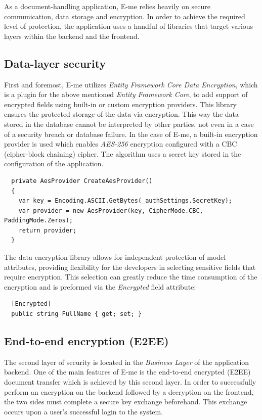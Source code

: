 As a document-handling application, E-me relies heavily on secure communication, data storage and encryption.
In order to achieve the required level of protection, the application uses a handful of libraries that target various layers within the backend and the frontend.

\subsection{Data-layer security}

First and foremost, E-me utilizes \emph{Entity Framework Core Data Encryption}, which is a plugin for the above mentioned \emph{Entity Framework Core},
 to add support of encrypted fields using built-in or custom encryption providers.
This library ensures the protected storage of the data via encryption.
This way the data stored in the database cannot be interpreted by other parties, not even in a case of a security breach or database failure.
In the case of E-me, a built-in encryption provider is used which enables \emph{AES-256} encryption configured with a CBC (cipher-block chaining) cipher.
The algorithm uses a secret key stored in the configuration of the application.

\begin{lstlisting}
  private AesProvider CreateAesProvider()
  {
	var key = Encoding.ASCII.GetBytes(_authSettings.SecretKey);
	var provider = new AesProvider(key, CipherMode.CBC,	 PaddingMode.Zeros);
	return provider;
  }
\end{lstlisting}

The data encryption library allows for independent protection of model attributes, providing flexibility for the developers in selecting sensitive fields
that require encryption. This selection can greatly reduce the time consumption of the encryption and is preformed via the \emph{Encrypted} field attribute:

\begin{lstlisting}
  [Encrypted]
  public string FullName { get; set; }
\end{lstlisting}

\subsection{End-to-end encryption (E2EE)}\label{end-to-end-encryption}

The second layer of security is located in the \emph{Business Layer} of the application backend.
One of the main features of E-me is the end-to-end encrypted (E2EE) document transfer which is achieved by this second layer.
In order to successfully perform an encryption on the backend followed by a decryption on the frontend, the two sides must complete a secure key exchange beforehand.
This exchange occurs upon a user's successful login to the system.

